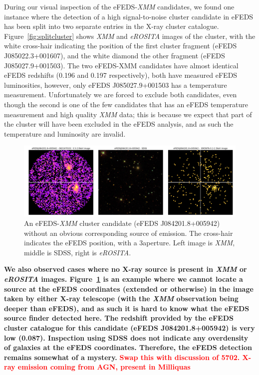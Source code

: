 \documentclass[fleqn,usenatbib]{mnras}
\begin{document}
During our visual inspection of the eFEDS-{\em XMM} candidates, we found one instance where the detection of a high signal-to-noise cluster candidate in eFEDS has been split into two separate entries in the X-ray cluster catalogue. Figure~\ref{fig:splitcluster} shows {\em XMM} and {\em eROSITA} images of the cluster, with the white cross-hair indicating the position of the first cluster fragment (eFEDS J085022.3+001607), and the white diamond the other fragment (eFEDS J085027.9+001503). The two eFEDS-XMM candidates have almost identical eFEDS redshifts (0.196 and 0.197 respectively), both have measured eFEDS luminosities, however, only eFEDS J085027.9+001503 has a temperature measurement. Unfortunately we are forced to exclude both candidates, even though the second is one of the few candidates that has an eFEDS temperature measurement and high quality {\em XMM} data; this is because we expect that part of the cluster will have been excluded in the eFEDS analysis, and as such the temperature and luminosity are invalid. 

\begin{figure}
    \centering
    \includegraphics[width=1\textwidth]{images/blanklowz_sdss.png}
    \caption[]{An eFEDS-{\em XMM} cluster candidate (eFEDS J084201.8+005942) without an obvious corresponding source of emission. The cross-hair indicates the eFEDS position, with a 3\arcmin aperture. Left image is {\em XMM}, middle is SDSS, right is {\em eROSITA}.}
    \label{fig:blanksky}
\end{figure}

{\bf We also observed cases where no X-ray source is present in {\em XMM} or {\em eROSITA} images. Figure~\ref{fig:blanksky} is an example where we cannot locate a source at the eFEDS coordinates (extended or otherwise) in the image taken by either X-ray telescope (with the {\em XMM} observation being deeper than eFEDS), and as such it is hard to know what the eFEDS source finder detected here. The redshift provided by the eFEDS cluster catalogue for this candidate (eFEDS J084201.8+005942) is very low (0.087).  Inspection using SDSS does not indicate any overdensity of galaxies at the eFEDS coordinates.  Therefore, the eFEDS detection remains somewhat of a mystery.} \textcolor{red}{\bf Swap this with discussion of 5702.  X-ray emission coming from AGN, present in Milliquas}  
\end{document}
